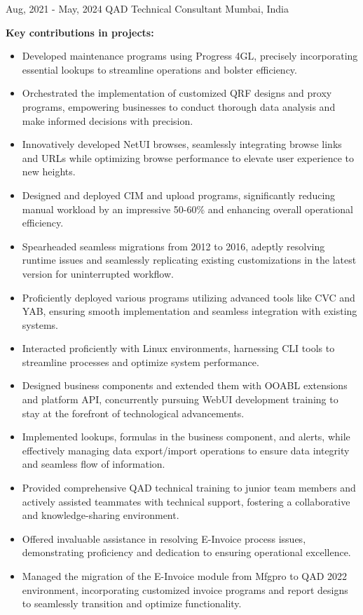 \documentclass{curriculum-vitae}
\begin{document}
{Aug, 2021 - May, 2024}
{QAD Technical Consultant}
{Mumbai, India}

\textbf{Key contributions in projects:}

\begin{itemize}
   \item Developed maintenance programs using Progress 4GL, precisely
      incorporating essential lookups to streamline operations and bolster
      efficiency.
   \item Orchestrated the implementation of customized QRF designs and proxy
      programs, empowering businesses to conduct thorough data analysis and
      make informed decisions with precision.
   \item Innovatively developed NetUI browses, seamlessly integrating browse
      links and URLs while optimizing browse performance to elevate user
      experience to new heights.
   \item Designed and deployed CIM and upload programs, significantly reducing
      manual workload by an impressive 50-60\% and enhancing overall operational
      efficiency.
   \item Spearheaded seamless migrations from 2012 to 2016, adeptly resolving
      runtime issues and seamlessly replicating existing customizations in the
      latest version for uninterrupted workflow.
   \item Proficiently deployed various programs utilizing advanced tools like
      CVC and YAB, ensuring smooth implementation and seamless integration with
      existing systems.
   \item Interacted proficiently with Linux environments, harnessing CLI tools
      to streamline processes and optimize system performance.
   \item Designed business components and extended them with OOABL extensions
      and platform API, concurrently pursuing WebUI development training to
      stay at the forefront of technological advancements.
   \item Implemented lookups, formulas in the business component, and alerts,
      while effectively managing data export/import operations to ensure data
      integrity and seamless flow of information.
   \item Provided comprehensive QAD technical training to junior team members
      and actively assisted teammates with technical support, fostering a
      collaborative and knowledge-sharing environment.
   \item Offered invaluable assistance in resolving E-Invoice process issues,
      demonstrating proficiency and dedication to ensuring operational
      excellence.
   \item Managed the migration of the E-Invoice module from Mfgpro to QAD 2022
      environment, incorporating customized invoice programs and report designs
      to seamlessly transition and optimize functionality.
\end{itemize}
\end{document}
